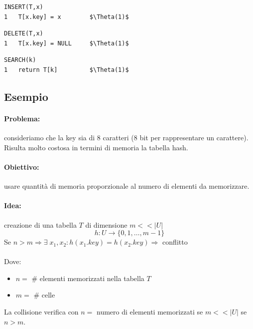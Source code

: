 \begin{mdframed}
\begin{lstlisting}[mathescape=true]
INSERT(T,x)
1   T[x.key] = x        $\Theta(1)$
\end{lstlisting}
\end{mdframed}
\begin{mdframed}
\begin{lstlisting}[mathescape=true]
DELETE(T,x)
1   T[x.key] = NULL     $\Theta(1)$
\end{lstlisting}
\end{mdframed}
\begin{mdframed}
\begin{lstlisting}[mathescape=true]
SEARCH(k)
1   return T[k]         $\Theta(1)$
\end{lstlisting}
\end{mdframed}

\newpage
\subsection{Esempio}
\paragraph{Problema:} consideriamo che la key sia di 8 caratteri (8 bit per rappresentare un carattere). Risulta molto costosa in termini di memoria la tabella hash.
\paragraph{Obiettivo:} usare quantità di memoria proporzionale al numero di elementi da memorizzare.
\paragraph{Idea:} creazione di una tabella $T$ di dimensione $m << |U|$
\begin{equation*}
    h: U \rightarrow \{0, 1, \dots, m-1\}
\end{equation*}
Se $n>m \Rightarrow \exists\; x_1,x_2:h(x_1.key) = h(x_2.key) \Rightarrow$ conflitto \\~\\
Dove:
\begin{itemize}
    \item $n = $ \# elementi memorizzati nella tabella $T$
    \item $m = $ \# celle
\end{itemize}

La collisione verifica con $n = $ numero di elementi memorizzati se $m <<|U|$ se $n > m$. \\~\\

